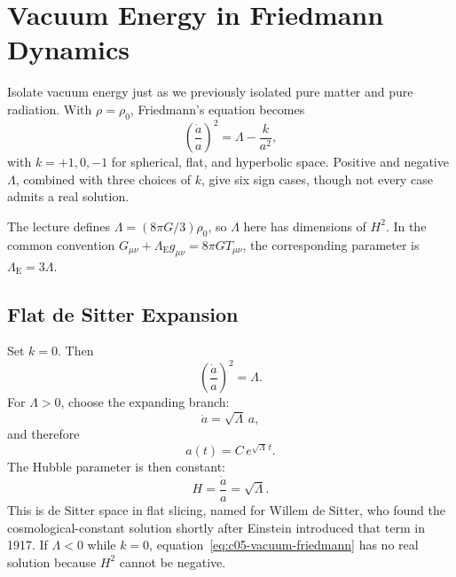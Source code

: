 \begin{classroomqa}
\end{classroomqa}

\section{Vacuum Energy in Friedmann Dynamics}

Isolate vacuum energy just as we previously isolated pure matter and pure radiation. With \(\rho=\rho_0\), Friedmann's equation becomes
\begin{equation}
\left(\frac{\dot a}{a}\right)^2=\Lambda-\frac{k}{a^2},
\label{eq:c05-vacuum-friedmann}
\end{equation}
with \(k=+1,0,-1\) for spherical, flat, and hyperbolic space. Positive and negative \(\Lambda\), combined with three choices of \(k\), give six sign cases, though not every case admits a real solution.

\begin{remark}
The lecture defines \(\Lambda=(8\pi G/3)\rho_0\), so \(\Lambda\) here has dimensions of \(H^2\). In the common convention \(G_{\mu\nu}+\Lambda_{\mathrm E}g_{\mu\nu}=8\pi G T_{\mu\nu}\), the corresponding parameter is \(\Lambda_{\mathrm E}=3\Lambda\).
\end{remark}

\subsection{Flat de Sitter Expansion}

Set \(k=0\). Then
\begin{equation}
\left(\frac{\dot a}{a}\right)^2=\Lambda.
\end{equation}
For \(\Lambda>0\), choose the expanding branch:
\begin{equation}
\dot a=\sqrt{\Lambda}\,a,
\end{equation}
and therefore
\begin{equation}
a(t)=C\,e^{\sqrt{\Lambda}\,t}.
\end{equation}
The Hubble parameter is then constant:
\begin{equation}
H=\frac{\dot a}{a}=\sqrt{\Lambda}.
\end{equation}
This is de Sitter space in flat slicing, named for Willem de Sitter, who found the cosmological-constant solution shortly after Einstein introduced that term in 1917. If \(\Lambda<0\) while \(k=0\), equation~\eqref{eq:c05-vacuum-friedmann} has no real solution because \(H^2\) cannot be negative.

